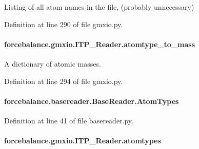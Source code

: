 Listing of all atom names in the file, (probably unnecessary) 



Definition at line 290 of file gmxio.\-py.

\hypertarget{classforcebalance_1_1gmxio_1_1ITP__Reader_ae4ae7fb78a864a7ca15f68b376e84c35}{
\paragraph[{atomtype\-\_\-to\-\_\-mass}]{\setlength{\rightskip}{0pt plus 5cm}forcebalance.\-gmxio.\-I\-T\-P\-\_\-\-Reader.\-atomtype\-\_\-to\-\_\-mass}}\label{classforcebalance_1_1gmxio_1_1ITP__Reader_ae4ae7fb78a864a7ca15f68b376e84c35}


A dictionary of atomic masses. 



Definition at line 294 of file gmxio.\-py.

\hypertarget{classforcebalance_1_1basereader_1_1BaseReader_ad5765e192499937376950410364014af}{
\paragraph[{Atom\-Types}]{\setlength{\rightskip}{0pt plus 5cm}forcebalance.\-basereader.\-Base\-Reader.\-Atom\-Types\hspace{0.3cm}{\ttfamily [inherited]}}}\label{classforcebalance_1_1basereader_1_1BaseReader_ad5765e192499937376950410364014af}


Definition at line 41 of file basereader.\-py.

\hypertarget{classforcebalance_1_1gmxio_1_1ITP__Reader_a771f60fa6b3020c422062bb9ceb51291}{
\paragraph[{atomtypes}]{\setlength{\rightskip}{0pt plus 5cm}forcebalance.\-gmxio.\-I\-T\-P\-\_\-\-Reader.\-atomtypes}}\label{classforcebalance_1_1gmxio_1_1ITP__Reader_a771f60fa6b3020c422062bb9ceb51291}


